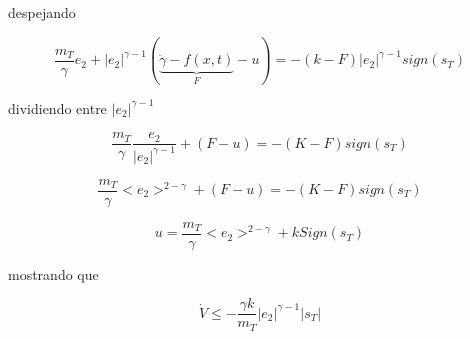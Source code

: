 despejando

\begin{equation*}
    \frac{m_T}{\gamma}e_2+|e_2|^{\gamma-1}(\underbrace{\ddot{\gamma}-f(x,t)}_F-u) = - (k-F)|e_2|^{\gamma-1}sign(s_T)
\end{equation*}

dividiendo entre $|e_2|^{\gamma-1}$

\begin{equation*}
    \frac{m_T}{\gamma}\frac{e_2}{|e_2|^{\gamma-1}}+(F-u)= -(K-F) sign(s_T)
\end{equation*}

\begin{equation*}
    \frac{m_T}{\gamma}<e_2>^{2-\gamma} + (F-u)=-(K-F)sign(s_T)
\end{equation*}

\begin{equation*}
    u=\frac{m_T}{\gamma}<e_2>^{2-\gamma}+k Sign(s_T)
\end{equation*}

mostrando que 

\begin{equation*}
    \dot{V}\leq - \frac{\gamma k}{ m_T}|e_2|^{\gamma-1}|s_T|
\end{equation*}